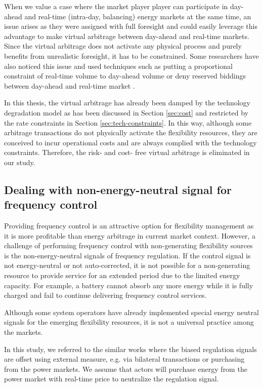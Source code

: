 When we value a case where the market player player can participate in day-ahead and real-time (intra-day, balancing) energy markets at the same time, an issue arises as they were assigned with full foresight and could easily leverage this advantage to make virtual arbitrage between day-ahead and real-time markets. Since the virtual arbitrage does not activate any physical process and purely benefits from unrealistic foresight, it has to be constrained. Some researchers have also noticed this issue and used techniques such as putting a proportional constraint of real-time volume to day-ahead volume \cite{Han2017} or deny reserved biddings between day-ahead and real-time market \cite{Berrada2016}.

In this thesis, the virtual arbitrage has already been damped by the technology degradation model as has been discussed in Section \ref{sec:cost} and restricted by the rate constraints in Section \ref{sec:tech-constraints}. In this way, although some arbitrage transactions do not physically activate the flexibility resources, they are conceived to incur operational costs and are always complied with the technology constraints. Therefore, the risk- and cost- free virtual arbitrage is eliminated in our study.

\subsection{Dealing with non-energy-neutral signal for frequency control}
Providing frequency control is an attractive option for flexibility management as it is more profitable than energy arbitrage in current market context. However, a challenge of performing frequency control with non-generating flexibility sources is the non-energy-neutral signals of frequency regulation. If the control signal is not energy-neutral or not auto-corrected, it is not possible for a non-generating resource to provide service for an extended period due to the limited energy capacity. For example, a battery cannot absorb any more energy while it is fully charged and fail to continue delivering frequency control services.

Although some system operators have already implemented special energy neutral signals for the emerging flexibility resources, it is not a universal practice among the markets. 

In this study, we referred to the similar works \cite{Megel2017}\cite{Oudalov2007}\cite{Borsche2013}\cite{Jin2014} where the biased regulation signals are offset using external measure, e.g. via bilateral transactions or purchasing from the power markets. We assume that actors will purchase energy from the power market with real-time price to neutralize the regulation signal.


